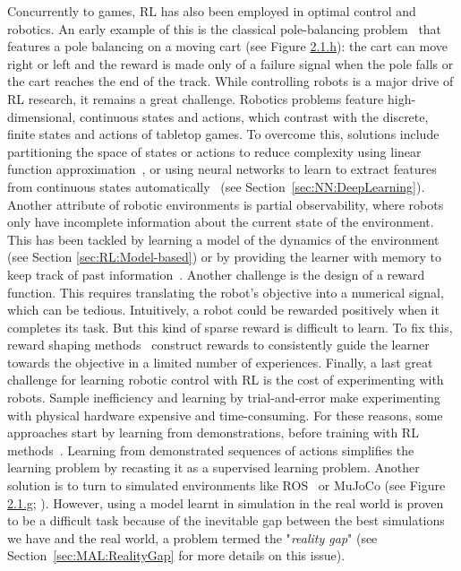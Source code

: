 Concurrently to games, RL has also been employed in optimal control and robotics. An early example of this is the classical pole-balancing problem~\citep{Michie1968_Boxes} that features a pole balancing on a moving cart (see Figure \hyperref[fig:rl-envs]{2.1.h}): the cart can move right or left and the reward is made only of a failure signal when the pole falls or the cart reaches the end of the track. While controlling robots is a major drive of RL research, it remains a great challenge. Robotics problems feature high-dimensional, continuous states and actions, which contrast with the discrete, finite states and actions of tabletop games. To overcome this, solutions include partitioning the space of states or actions to reduce complexity using linear function approximation~\citep{Busoniu2017_FuncApprox}, or using neural networks to learn to extract features from continuous states automatically~\citep{Bishop2006_Pattern} (see Section~\ref{sec:NN:DeepLearning}). Another attribute of robotic environments is partial observability, where robots only have incomplete information about the current state of the environment. This has been tackled by learning a model of the dynamics of the environment~\citep{Bagnell2001_Helicopter} (see Section \ref{sec:RL:Model-based}) or by providing the learner with memory to keep track of past information~\citep{Wierstra2007_POMDPs}. Another challenge is the design of a reward function. This requires translating the robot's objective into a numerical signal, which can be tedious. Intuitively, a robot could be rewarded positively when it completes its task. But this kind of sparse reward is difficult to learn. To fix this, reward shaping methods~\citep{Ng1999_Shaping, Laud2004_Shaping} construct rewards to consistently guide the learner towards the objective in a limited number of experiences. Finally, a last great challenge for learning robotic control with RL is the cost of experimenting with robots. Sample inefficiency and learning by trial-and-error make experimenting with physical hardware expensive and time-consuming. For these reasons, some approaches start by learning from demonstrations, before training with RL methods~\citep{Abbeel2006_Helicopter,Vecerik2017_Demonstrations}. Learning from demonstrated sequences of actions simplifies the learning problem by recasting it as a supervised learning problem. Another solution is to turn to simulated environments like ROS~\citep{Macenski2022_ROS} or MuJoCo (see Figure \hyperref[fig:rl-envs]{2.1.g}; \cite{Todorov2012_Mujoco}). However, using a model learnt in simulation in the real world is proven to be a difficult task because of the inevitable gap between the best simulations we have and the real world, a problem termed the "\textit{reality gap}" (see Section~\ref{sec:MAL:RealityGap} for more details on this issue). 

